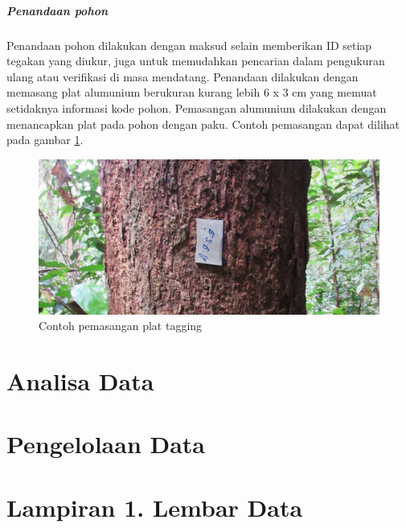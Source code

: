 \documentclass[
]{book}
\begin{document}
\hypertarget{penandaan-pohon}{%
\paragraph*{Penandaan pohon}\label{penandaan-pohon}}

Penandaan pohon dilakukan dengan maksud selain memberikan ID setiap tegakan yang diukur, juga untuk memudahkan pencarian dalam pengukuran ulang atau verifikasi di masa mendatang. Penandaan dilakukan dengan memasang plat alumunium berukuran kurang lebih 6 x 3 cm yang memuat setidaknya informasi kode pohon. Pemasangan alumunium dilakukan dengan menancapkan plat pada pohon dengan paku. Contoh pemasangan dapat dilihat pada gambar \ref{fig:figtag}.

\begin{figure}

{\centering \includegraphics[width=1\linewidth]{images/tagging} 

}

\caption{Contoh pemasangan plat tagging}\label{fig:figtag}
\end{figure}

\hypertarget{analisa-data}{%
\chapter*{Analisa Data}\label{analisa-data}}

\hypertarget{pengelolaan-data}{%
\chapter*{Pengelolaan Data}\label{pengelolaan-data}}

\hypertarget{lampiran-1.-lembar-data}{%
\chapter*{Lampiran 1. Lembar Data}\label{lampiran-1.-lembar-data}}
\end{document}
